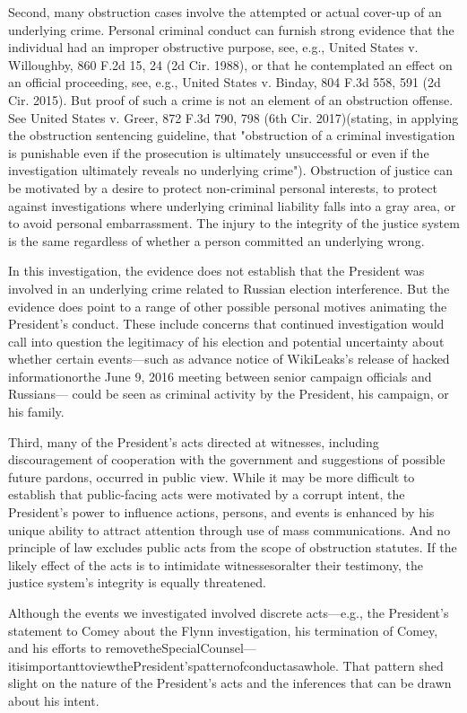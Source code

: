 {Second, many obstruction cases involve the attempted or actual cover-up of an underlying crime.
Personal criminal conduct can furnish strong evidence that the individual had an improper obstructive purpose, see, e.g., United States v. Willoughby, 860 F.2d 15, 24 (2d Cir. 1988), or that he contemplated an effect on an official proceeding, see, e.g., United States v. Binday, 804 F.3d 558, 591 (2d Cir. 2015).
But proof of such a crime is not an element of an obstruction offense.
See United States v. Greer, 872 F.3d 790, 798 (6th Cir. 2017)(stating, in applying the obstruction sentencing guideline, that "obstruction of a criminal investigation is punishable even if the prosecution is ultimately unsuccessful or even if the investigation ultimately reveals no underlying crime").
Obstruction of justice can be motivated by a desire to protect non-criminal personal interests, to protect against investigations where underlying criminal liability falls into a gray area, or to avoid personal embarrassment.
The injury to the integrity of the justice system is the same regardless of whether a person committed an underlying wrong.

In this investigation, the evidence does not establish that the President was involved in an underlying crime related to Russian election interference.
But the evidence does point to a range of other possible personal motives animating the President's conduct.
These include concerns that continued investigation would call into question the legitimacy of his election and potential uncertainty about whether certain events—such as advance notice of WikiLeaks's release of hacked informationorthe June 9, 2016 meeting between senior campaign officials and Russians— could be seen as criminal activity by the President, his campaign, or his family.

Third, many of the President's acts directed at witnesses, including discouragement of cooperation with the government and suggestions of possible future pardons, occurred in public view.
While it may be more difficult to establish that public-facing acts were motivated by a corrupt intent, the President's power to influence actions, persons, and events is enhanced by his unique ability to attract attention through use of mass communications.
And no principle of law excludes public acts from the scope of obstruction statutes.
If the likely effect of the acts is to intimidate witnessesoralter their testimony, the justice system's integrity is equally threatened.

Although the events we investigated involved discrete acts—e.g., the President's statement to Comey about the Flynn investigation, his termination of Comey, and his efforts to removetheSpecialCounsel—itisimportanttoviewthePresident'spatternofconductasawhole.
That pattern shed slight on the nature of the President's acts and the inferences that can be drawn about his intent.

}
